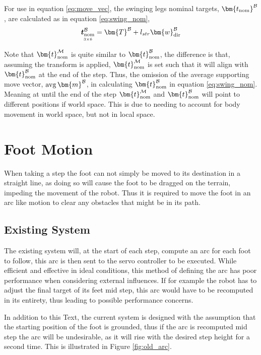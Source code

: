         For use in equation \ref{eq:move_vec}, the swinging legs nominal targets, \(\bm{t_\text{nom}} ^\fbody\), are calculated as 
        in equation \ref{eq:swing_nom},
        \begin{equation} \label{eq:swing_nom}
            \mdim{\boldsymbol{t}_\text{nom}^\fbody}{3}{6} = \bm{T}^\fbody + l_{str}\bm{w}_\text{dir}^\fbody
        \end{equation}

        Note that \(\bm{t}_\text{nom}^{\fmap}\) is quite similar to \(\bm{t}_\text{nom}^\fbody\), the difference is that, 
        assuming the  transform is applied, \(\bm{t}_\text{nom}^{\fmap}\) is set such that it
        will align with \(\bm{t}_\text{nom}^\fbody\)
        at the end of the step. Thus, the omission of the average supporting move vector, \(\avg \bm{m}^\fbody\), in calculating \(\bm{t}_\text{nom}^\fbody\)
        in equation \ref{eq:swing_nom}.
        Meaning at until the end of the step \(\bm{t}_\text{nom}\inrefframe{M}\) and \(\bm{t}_\text{nom}^\fbody\) will point 
        to different positions if world space. This is due to needing to account for body movement in world space, but not in local space.

    \newpage
    \section{Foot Motion} \label{sec:arc_generation}
    When taking a step the foot can not simply be moved to its destination in a straight line, as doing so will cause the foot to be dragged on the terrain,
    impeding the movement of the robot. Thus it is required to move the foot in an arc like motion to clear any obstacles that might be in its path.


    \subsection{Existing System}
        The existing system will, at the start of each step, compute an arc for each foot to follow, this arc is then sent to the servo controller
        to be executed. While efficient and effective in ideal conditions, this method of defining the arc has poor performance when considering external
        influences. If for example the robot has to adjust the final target of its feet mid step, this arc would have to be recomputed in its entirety,
        thus leading to possible performance concerns.

        In addition to this Text, the current system is designed with the assumption that the starting position of the foot is grounded, thus if the arc is recomputed
        mid step the arc will be undesirable, as it will rise with the desired step height for a second time. This is illustrated in Figure \ref{fig:old_arc}.

